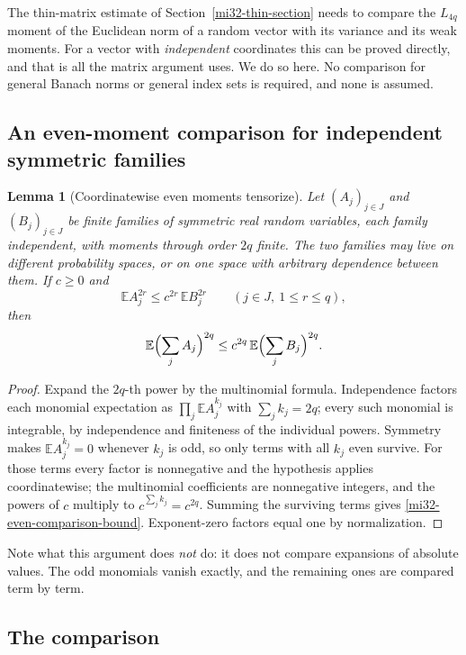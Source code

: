 \documentclass[11pt]{article}
\newtheorem{lemma}[theorem]{Lemma}
\theoremstyle{definition}
\theoremstyle{remark}
\newcommand{\E}{\mathbb E}
\begin{document}
The thin-matrix estimate of Section~\ref{mi32-thin-section} needs to
compare the $L_{4q}$ moment of the Euclidean norm of a random vector
with its variance and its weak moments. For a vector with
\emph{independent} coordinates this can be proved directly, and that is
all the matrix argument uses. We do so here. No comparison for general
Banach norms or general index sets is required, and none is assumed.

\subsection{An even-moment comparison for independent symmetric families}

\begin{lemma}[Coordinatewise even moments tensorize]
\label{mi32-even-comparison}
Let $(A_j)_{j\in J}$ and $(B_j)_{j\in J}$ be finite families of
symmetric real random variables, each family independent, with moments
through order $2q$ finite. The two families may live on different
probability spaces, or on one space with arbitrary dependence between
them. If $c\ge0$ and
\[
 \E A_j^{2r}\le c^{2r}\,\E B_j^{2r}
 \qquad(j\in J,\ 1\le r\le q),
\]
then
\begin{equation}\label{mi32-even-comparison-bound}
 \E\Bigl(\sum_jA_j\Bigr)^{2q}
 \le c^{2q}\,\E\Bigl(\sum_jB_j\Bigr)^{2q}.
\end{equation}
\end{lemma}
\begin{proof}
Expand the $2q$-th power by the multinomial formula. Independence
factors each monomial expectation as $\prod_j\E A_j^{k_j}$ with
$\sum_jk_j=2q$; every such monomial is integrable, by independence and
finiteness of the individual powers. Symmetry makes $\E A_j^{k_j}=0$
whenever $k_j$ is odd, so only terms with all $k_j$ even survive. For
those terms every factor is nonnegative and the hypothesis applies
coordinatewise; the multinomial coefficients are nonnegative integers,
and the powers of $c$ multiply to $c^{\sum_jk_j}=c^{2q}$. Summing the
surviving terms gives \eqref{mi32-even-comparison-bound}. Exponent-zero
factors equal one by normalization.
\end{proof}

Note what this argument does \emph{not} do: it does not compare
expansions of absolute values. The odd monomials vanish exactly, and
the remaining ones are compared term by term.

\subsection{The comparison}
\end{document}
